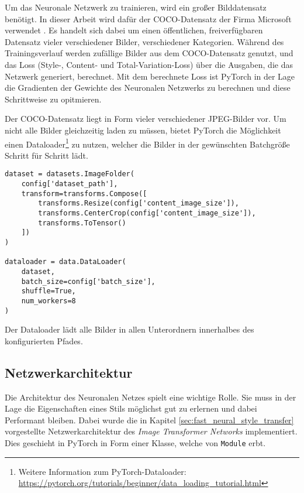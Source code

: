 Um das Neuronale Netzwerk zu trainieren, wird ein großer Bilddatensatz benötigt. In dieser Arbeit wird dafür der COCO-Datensatz der Firma Microsoft verwendet \cite{DBLP:journals/corr/LinMBHPRDZ14}. Es handelt sich dabei um einen öffentlichen, freiverfügbaren Datensatz vieler verschiedener Bilder, verschiedener Kategorien. Während des Trainingsverlauf werden zufällige Bilder aus dem COCO-Datensatz genutzt, 
und das Loss  (Style-, Content- und Total-Variation-Loss) über die Ausgaben, die das Netzwerk generiert, berechnet.
Mit dem berechnete Loss ist PyTorch in der Lage die Gradienten der Gewichte des Neuronalen Netzwerks zu berechnen und diese 
Schrittweise zu opitmieren.

Der COCO-Datensatz liegt in Form vieler verschiedener JPEG-Bilder vor. 
Um nicht alle Bilder gleichzeitig laden zu müssen, bietet PyTorch die Möglichkeit einen Dataloader\footnote{Weitere Information zum PyTorch-Dataloader: \url{https://pytorch.org/tutorials/beginner/data_loading_tutorial.html}}
zu nutzen, welcher die Bilder in der gewünschten Batchgröße Schritt für Schritt lädt.

\begin{listing}[H]
\begin{verbatim}
dataset = datasets.ImageFolder(
    config['dataset_path'],
    transform=transforms.Compose([
        transforms.Resize(config['content_image_size']),
        transforms.CenterCrop(config['content_image_size']),
        transforms.ToTensor()
    ])
)

dataloader = data.DataLoader(
    dataset, 
    batch_size=config['batch_size'],
    shuffle=True, 
    num_workers=8
)
\end{verbatim}
\end{listing}

Der Dataloader lädt alle Bilder in allen Unterordnern innerhalbes des konfigurierten Pfades.

\subsection{Netzwerkarchitektur}
\label{sec:network_architecture}

Die Architektur des Neuronalen Netzes spielt eine wichtige Rolle. Sie muss in der Lage die Eigenschaften eines Stils möglichst gut zu erlernen und dabei Performant bleiben. Dabei wurde die in Kapitel \ref{sec:fast_neural_style_transfer} vorgestellte Netzwerkarchitektur des \textit{Image Transformer Networks} implementiert.
Dies geschieht in PyTorch in Form einer Klasse, welche von \texttt{Module} erbt.

